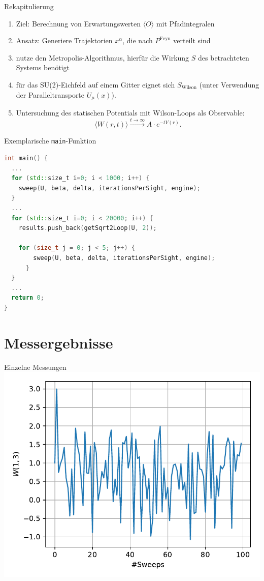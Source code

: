 \documentclass[ngerman]{beamer}
\begin{document}
\begin{frame}{Rekapitulierung}
	\begin{enumerate}
		\item Ziel: Berechnung von Erwartungswerten $\langle O \rangle$ mit Pfadintegralen
		\item Ansatz: Generiere Trajektorien $x^\alpha$, die nach $P^\text{Feyn}$ verteilt sind
		\item nutze den Metropolis-Algorithmus, hierfür die Wirkung $S$ des betrachteten Systems benötigt
		\item für das SU(2)-Eichfeld auf einem Gitter eignet sich $S_\text{Wilson}$ (unter Verwendung der Paralleltransporte $U_\mu(x)$).
		\item Untersuchung des statischen Potentials mit Wilson-Loops als Observable:
		\[
		\langle W(r,t) \rangle \xrightarrow{t \rightarrow \infty} A \cdot e^{-t V(r)}.
		\]
	\end{enumerate}
\end{frame}

\begin{frame}[fragile]{Exemplarische \texttt{main}-Funktion}
	\begin{lstlisting}[language=C++,basicstyle=\small]
int main() {
  ...
  for (std::size_t i=0; i < 1000; i++) {
    sweep(U, beta, delta, iterationsPerSight, engine);
  }
  ...
  for (std::size_t i=0; i < 20000; i++) {
    results.push_back(getSqrt2Loop(U, 2));
	
    for (size_t j = 0; j < 5; j++) {
        sweep(U, beta, delta, iterationsPerSight, engine);
      }
  }
  ...
  return 0;
}
	\end{lstlisting}
\end{frame}

\section{Messergebnisse}

\begin{frame}{Einzelne Messungen}
	\centering
    \includegraphics[width=.8\textwidth]{1x3loop}
\end{frame}
\end{document}
